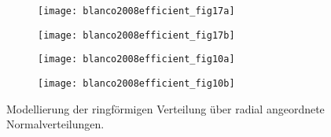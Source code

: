 \begin{figure}[!ht]
	\begin{subfigure}[t]{0.24\linewidth}
		\texttt{[image: blanco2008efficient\_fig17a]}
		\caption{}
		\label{fig:blanco2008efficient_fig17a}
	\end{subfigure}
	\hfill
	\begin{subfigure}[t]{0.24\linewidth}
		\texttt{[image: blanco2008efficient\_fig17b]}
		\caption{}
		\label{fig:blanco2008efficient_fig17b}
	\end{subfigure}
	\hfill
	\begin{subfigure}[t]{0.24\linewidth}
		\texttt{[image: blanco2008efficient\_fig10a]}
		\caption{}
		\label{fig:blanco2008efficient_fig10a}
	\end{subfigure}
	\hfill
	\begin{subfigure}[t]{0.24\linewidth}
		\texttt{[image: blanco2008efficient\_fig10b]}
		\caption{}
		\label{fig:blanco2008efficient_fig10b}
	\end{subfigure}
	\caption{Modellierung der ringförmigen Verteilung über radial angeordnete Normalverteilungen.}
	\label{fig:blanco2008efficient}
\end{figure}







